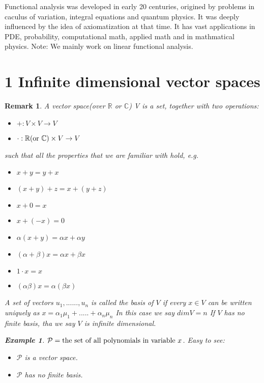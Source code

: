 \documentclass{article}
\newtheorem*{remark}{Remark}
\newtheorem*{example}{Example}
\begin{document}
Functional analysis was developed in early 20 centuries, 
origined by problems in caculus of variation, 
integral equations and quantum physics. 
It was deeply influenced by the idea of axiomatization at that time.
It has vast applications in PDE, probability, computational math, applied math and in mathmatical physics.
Note: We mainly work on linear functional analysis.

\section*{1 Infinite dimensional vector spaces}
\begin{remark}
    A vector space(over $\mathbb{R}$ or $\mathbb{C}$) V is a set, together with two operations:
    \begin{itemize}
        \item $+: V \times V \rightarrow V$
        \item $\cdot:\mathbb{R}(\textnormal{or } \mathbb{C}) \times V \rightarrow V$
    \end{itemize}
    such that all the properties that we are familiar with hold, e.g.
    \begin{itemize}
        \item $x + y = y + x$
        \item $(x + y) + z = x + (y + z)$
        \item $x + 0 = x$
        \item $x + (-x) = 0$
        \item $\alpha(x + y) = \alpha x + \alpha y$
        \item $(\alpha + \beta)x = \alpha x + \beta x$
        \item $1 \cdot x = x$
        \item $(\alpha \beta)x = \alpha(\beta x)$
    \end{itemize}
    A set of vectors ${u_1, ......, u_n}$ is called the basis of $V$ 
    if every $x \in V$ can be written uniquely as 
    $x = \alpha_1\mu_1 + ..... + \alpha_n\mu_n$
    In this case we say $dimV = n$
    If $V$ has no finite basis, tha we say $V$ is infinite dimensional.
    \begin{example}
        $\mathcal{P} = \textnormal{the set of all polynomials in variable } x$.
        Easy to see:
        \begin{itemize}
            \item $\mathcal{P}$ is a vector space.
            \item $\mathcal{P}$ has no finite basis.

\end{itemize}
\end{example}
\end{remark}
\end{document}
